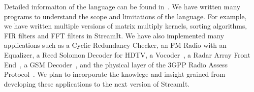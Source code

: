 Detailed informaiton of the language can be found
in~\cite{streamitcc}. We have written many programs to understand the
scope and limitations of the language. For example, we have written
multiple versions of matrix multiply kernels, sorting algorithms, FIR
filters and FFT filters in StreamIt. We have also implemented many
applications such as a Cyclic Redundancy Checker, an FM Radio with an
Equalizer, a Reed Solomon Decoder for HDTV, a Vocoder~\cite{seneff80},
a Radar Array Front End~\cite{pca}, a GSM Decoder~\cite{gsm}, and the physical
layer of the 3GPP Radio Assess Protocol~\cite{3gpp}.  We plan to
incorporate the knowlege and insight grained from developing these
applications to the next version of StreamIt.
